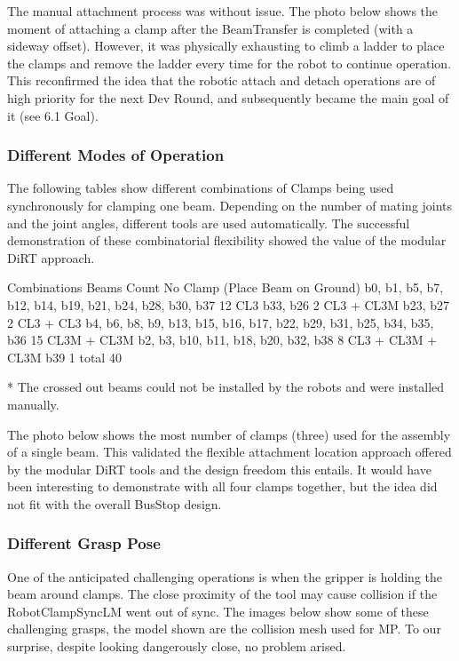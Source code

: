 \begin{itemize}
\begin{enumerate}
\begin{enumerate}
The manual attachment process was without issue. The photo below shows the moment of attaching a clamp after the BeamTransfer is completed (with a sideway offset). However, it was physically exhausting to climb a ladder to place the clamps and remove the ladder every time for the robot to continue operation. This reconfirmed the idea that the robotic attach and detach operations are of high priority for the next Dev Round, and subsequently became the main goal of it (see 6.1 Goal).

\subsubsection{Different Modes of Operation}
The following tables show different combinations of Clamps being used synchronously for clamping one beam. Depending on the number of mating joints and the joint angles, different tools are used automatically. The successful demonstration of these combinatorial flexibility showed the value of the modular DiRT approach. 

Combinations
Beams
Count
No Clamp
(Place Beam on Ground)
b0, b1, b5, b7, b12, b14, b19, b21, b24, b28, b30, b37
12
CL3
b33, b26
2
CL3 + CL3M
b23, b27
2
CL3 + CL3
b4, b6, b8, b9, b13, b15, b16, b17, b22, b29, b31, b25, b34, b35, b36
15
CL3M + CL3M
b2, b3, b10, b11, b18, b20, b32, b38
8
CL3 + CL3M + CL3M
b39
1
total
40

* The crossed out beams could not be installed by the robots and were installed manually.

The photo below shows the most number of clamps (three) used for the assembly of a single beam. This validated the flexible attachment location approach offered by the modular DiRT tools and the design freedom this entails. It would have been interesting to demonstrate with all four clamps together, but the idea did not fit with the overall BusStop design.


\subsubsection{Different Grasp Pose}
One of the anticipated challenging operations is when the gripper is holding the beam around clamps. The close proximity of the tool may cause collision if the RobotClampSyncLM went out of sync. The images below show some of these challenging grasps, the model shown are the collision mesh used for MP. To our surprise, despite looking dangerously close, no problem arised.


\end{enumerate}
\end{enumerate}
\end{itemize}
